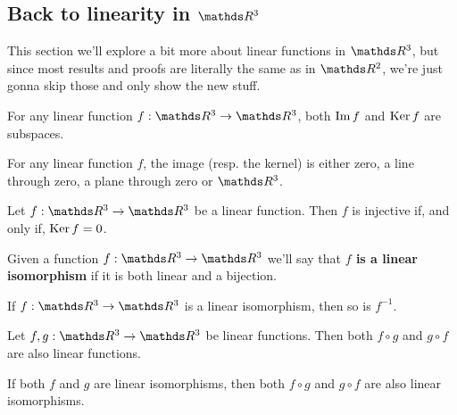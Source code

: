 \newpage
\subsection{Back to linearity in $\R^3$}

This section we'll explore a bit more about linear functions in $\R^3$, but since most results and proofs are literally the same as in $\R^2$, we're just gonna skip those and only show the new stuff.

\begin{prop}
	For any linear function $f:\R^3\to\R^3$, both $\operatorname{Im} f$ and $\operatorname{Ker} f$ are subspaces.
\end{prop}

\begin{cor}
	For any linear function $f$, the image (resp. the kernel) is either zero, a line through zero, a plane through zero or $\R^3$.
\end{cor}

\begin{prop}
	Let $f:\R^3\to\R^3$ be a linear function. Then $f$ is injective if, and only if, $\operatorname{Ker} f =0$.
\end{prop}

\begin{df}
	Given a function $f:\R^3\to\R^3$ we'll say that \textbf{$f$ is a linear isomorphism} if it is both linear and a bijection.
\end{df}

\begin{lemma}
	If $f:\R^3\to\R^3$ is a linear isomorphism, then so is $f^{-1}$.
\end{lemma}

\begin{prop}
	Let $f,g:\R^3\to\R^3$ be linear functions. Then both $f\circ g$ and $g\circ f$ are also linear functions.
\end{prop}
\begin{cor}
	If both $f$ and $g$ are linear isomorphisms, then both $f\circ g$ and $g\circ f$ are also linear isomorphisms.
\end{cor}

